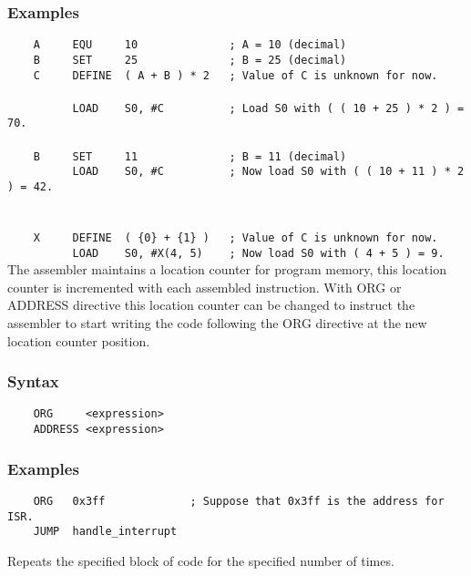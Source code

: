     \subsubsection{Examples}
        \verb'    A     EQU     10              ; A = 10 (decimal)'\\
        \verb'    B     SET     25              ; B = 25 (decimal)'\\
        \verb'    C     DEFINE  ( A + B ) * 2   ; Value of C is unknown for now.'\\
        \verb''\\
        \verb'          LOAD    S0, #C          ; Load S0 with ( ( 10 + 25 ) * 2 ) = 70.'\\
        \verb''\\
        \verb'    B     SET     11              ; B = 11 (decimal)'\\
        \verb'          LOAD    S0, #C          ; Now load S0 with ( ( 10 + 11 ) * 2 ) = 42.'\\
        \verb''\\
        \verb''\\
        \verb'    X     DEFINE  ( {0} + {1} )   ; Value of C is unknown for now.'\\
        \verb'          LOAD    S0, #X(4, 5)    ; Now load S0 with ( 4 + 5 ) = 9.'\\

    The assembler maintains a location counter for program memory, this location counter is incremented with each assembled instruction. With ORG or ADDRESS directive this location counter can be changed to instruct the assembler to start writing the code following the ORG directive at the new location counter position.

    \subsubsection{Syntax}
        \verb'    ORG     <expression>'\\
        \verb'    ADDRESS <expression>'


    \subsubsection{Examples}
        \verb'    ORG   0x3ff             ; Suppose that 0x3ff is the address for ISR.'\\
        \verb'    JUMP  handle_interrupt'

    Repeats the specified block of code for the specified number of times.


